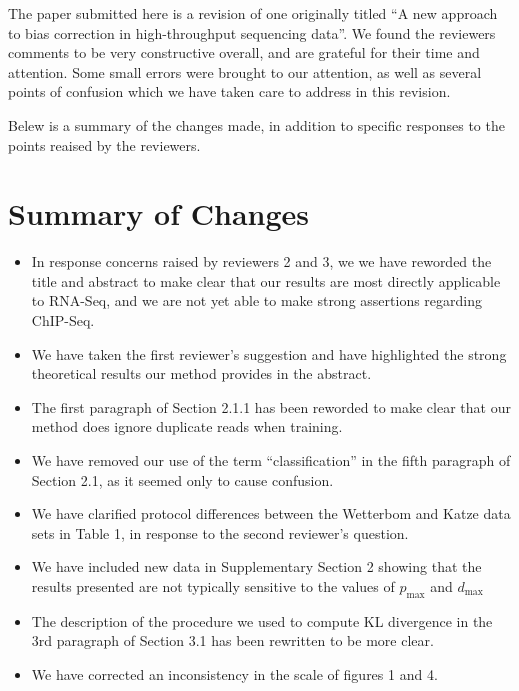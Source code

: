 \documentclass{article}
\begin{document}
The paper submitted here is a revision of one originally titled ``A new approach
to bias correction in high-throughput sequencing data''.  We found the reviewers
comments to be very constructive overall, and are grateful for their time and
attention. Some small errors were brought to our attention, as well as several
points of confusion which we have taken care to address in this revision.

Belew is a summary of the changes made, in addition to specific responses to the
points reaised by the reviewers.

\section*{Summary of Changes}

\begin{itemize}
\item In response concerns raised by reviewers 2 and 3, we we have reworded the
title and abstract to make clear that our results are most directly applicable
to RNA-Seq, and we are not yet able to make strong assertions regarding
ChIP-Seq.

\item We have taken the first reviewer's suggestion and have highlighted the
strong theoretical results our method provides in the abstract.

\item The first paragraph of Section 2.1.1 has been reworded to make clear that
our method does ignore duplicate reads when training.

\item We have removed our use of the term ``classification'' in the fifth
paragraph of Section 2.1, as it seemed only to cause confusion.

\item We have clarified protocol differences between the Wetterbom and Katze
data sets in Table 1, in response to the second reviewer's question.

\item We have included new data in Supplementary Section 2 showing that the
results presented are not typically sensitive to the values of $p_{\text{max}}$
and $d_{\text{max}}$

\item The description of the procedure we used to compute KL divergence in the
3rd paragraph of Section 3.1 has been rewritten to be more clear.

\item We have corrected an inconsistency in the scale of figures 1 and 4.


\end{itemize}
\end{document}
